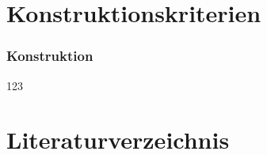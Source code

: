 \documentclass[hyperref={pdfpagemode=FullScreen, colorlinks=false}]{beamer}
\begin{document}
\maketitle


\section{Konstruktionskriterien}

\begin{frame}
\frametitle{Konstruktion}
123
\end{frame}







\section*{Literaturverzeichnis}

\begin{frame}[allowframebreaks]{}
	\printbibliography
\end{frame}
\end{document}
